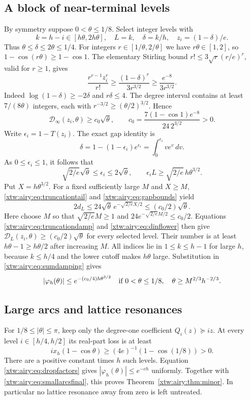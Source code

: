 \documentclass[11pt]{article}
\theoremstyle{remark}\newtheorem{remark}[theorem]{Remark}
\begin{document}
\subsection{A block of near-terminal levels}
By symmetry suppose $0<\theta\le1/8$. Select integer levels with
\[
 k=h-i\in[h\theta,2h\theta],\quad L=k,\quad
 \delta=k/h,\quad z_i=(1-\delta)/e.
\]
Thus $\theta\le\delta\le2\theta\le1/4$.
For integers $r\in[1/\theta,2/\theta]$ we have $r\theta\in[1,2]$, so
$1-\cos(r\theta)\ge1-\cos1$.
The elementary Stirling bound $r!\le3\sqrt r(r/e)^r$, valid for $r\ge1$,
gives
\[
 \frac{r^{r-1}z_i^r}{r!}\ge\frac{(1-\delta)^r}{3r^{3/2}}
 \ge\frac{e^{-8}}{3r^{3/2}}.
\]
Indeed $\log(1-\delta)\ge-2\delta$ and $r\delta\le4$.
The degree interval contains at least $7/(8\theta)$ integers, each with
$r^{-3/2}\ge(\theta/2)^{3/2}$. Hence
\begin{equation}\label{xtw:airy:eq:dinflower}
 \mathcal D_\infty(z_i,\theta)\ge c_0\sqrt\theta,
 \qquad c_0=\frac{7(1-\cos1)e^{-8}}{24\,2^{3/2}}>0.
\end{equation}
Write $\epsilon_i=1-T(z_i)$. The exact gap identity is
\[
 \delta=1-(1-\epsilon_i)e^{\epsilon_i}
        =\int_0^{\epsilon_i}v e^v\,dv.
\]
As $0\le\epsilon_i\le1$, it follows that
\begin{equation}\label{xtw:airy:eq:gapbounds}
 \sqrt{2/e}\sqrt\theta\le\epsilon_i\le2\sqrt\theta,
 \qquad\epsilon_iL\ge\sqrt{2/e}\,h\theta^{3/2}.
\end{equation}
Put $X=h\theta^{3/2}$. For a fixed sufficiently large $M$ and $X\ge M$,
\eqref{xtw:airy:eq:truncationtail} and \eqref{xtw:airy:eq:gapbounds} yield
\[
 2d_L\le24\sqrt\theta\,e^{-\sqrt{2/e}X/2}
       \le(c_0/2)\sqrt\theta.
\]
Here choose $M$ so that $\sqrt{2/e}M\ge1$ and
$24e^{-\sqrt{2/e}M/2}\le c_0/2$.
Equations \eqref{xtw:airy:eq:truncationdamp} and \eqref{xtw:airy:eq:dinflower} then give
$\mathcal D_L(z_i,\theta)\ge(c_0/2)\sqrt\theta$ for every selected level.
Their number is at least $h\theta-1\ge h\theta/2$ after increasing $M$.
All indices lie in $1\le k\le h-1$ for large $h$, because $k\le h/4$ and
the lower cutoff makes $h\theta$ large. Substitution in
\eqref{xtw:airy:eq:sumdamping} gives
\begin{equation}\label{xtw:airy:eq:smallarcsfinal}
 |\varphi_h(\theta)|\le e^{-(c_0/4)h\theta^{3/2}}
 \quad\hbox{if }0<\theta\le1/8,\quad
 \theta\ge M^{2/3}h^{-2/3}.
\end{equation}

\subsection{Large arcs and lattice resonances}
For $1/8\le|\theta|\le\pi$, keep only the degree-one coefficient
$Q_i(z)\succeq iz$. At every level $i\in[h/4,h/2]$ its real-part loss is
at least
\[
 ix_h(1-\cos\theta)\ge(4e)^{-1}(1-\cos(1/8))>0.
\]
There are a positive constant times $h$ such levels. Equation
\eqref{xtw:airy:eq:dropfactors} gives $|\varphi_h(\theta)|\le e^{-ch}$ uniformly.
Together with \eqref{xtw:airy:eq:smallarcsfinal}, this proves
Theorem~\ref{xtw:airy:thm:minor}. In particular no lattice resonance away from zero
is left untreated.
\end{document}
